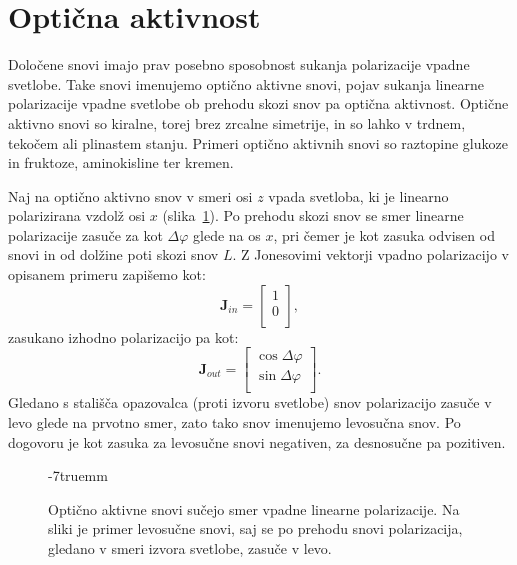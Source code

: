 \section{Optična aktivnost}
Določene snovi imajo prav posebno sposobnost sukanja polarizacije vpadne svetlobe.
Take snovi imenujemo optično aktivne snovi, pojav sukanja linearne polarizacije
vpadne svetlobe ob prehodu skozi snov pa optična aktivnost.
Optične aktivno snovi so kiralne, torej brez zrcalne simetrije, in so lahko
v trdnem, tekočem ali plinastem stanju. Primeri optično aktivnih snovi
so raztopine glukoze in fruktoze, aminokisline ter kremen.

Naj na optično aktivno snov v smeri osi $z$ 
vpada svetloba, ki je linearno polarizirana vzdolž osi $x$ 
(slika~\ref{fig:09_aktivnost}). Po 
prehodu skozi snov se smer linearne polarizacije
zasuče za kot $\Delta \varphi$ glede na os $x$, pri čemer je kot zasuka 
odvisen od snovi in od dolžine poti skozi snov $L$. Z Jonesovimi
vektorji vpadno polarizacijo v opisanem primeru zapišemo kot:
\begin{equation}
\mathbf{J}_{in} = 
\left[\begin{array}{c}
1\\
0\\
\end{array}\right]\!\!,
\label{eq:09_40}
\end{equation}
zasukano izhodno polarizacijo pa kot:
\begin{equation}
\mathbf{J}_{out} = 
\left[\begin{array}{c}
\cos \Delta \varphi\\
\sin \Delta \varphi\\
\end{array}\right]\!\!.
\label{eq:09_41}
\end{equation}
Gledano s stališča opazovalca (proti izvoru svetlobe)
snov polarizacijo zasuče v levo glede na prvotno smer, zato tako snov imenujemo
levosučna snov. Po dogovoru je kot zasuka za levosučne snovi negativen, za
desnosučne pa pozitiven.
\begin{figure}[ht]
\centering
\def\svgwidth{100truemm} 

\caption{Optično aktivne snovi sučejo smer vpadne linearne polarizacije. Na sliki
je primer levosučne snovi, saj se po prehodu snovi polarizacija, gledano v smeri 
izvora svetlobe, zasuče v levo.}
\label{fig:09_aktivnost}
\vglue-7truemm
\end{figure}
 
